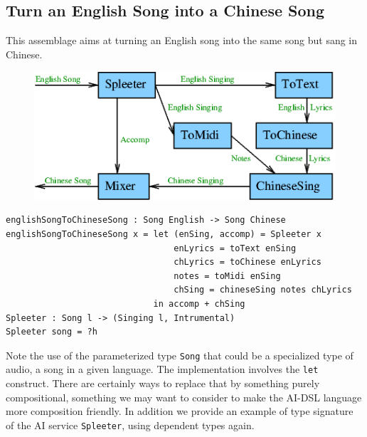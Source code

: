 \documentclass[]{article}
\begin{document}
\subsection{Turn an English Song into a Chinese Song}
This assemblage aims at turning an English song into the same song but
sang in Chinese.
\begin{figure}[H]
  \centering
  \includegraphics[scale=0.55]{figs/EnglishToChineseSong.png}
\end{figure}
\begin{verbatim}
englishSongToChineseSong : Song English -> Song Chinese
englishSongToChineseSong x = let (enSing, accomp) = Spleeter x
                                 enLyrics = toText enSing
                                 chLyrics = toChinese enLyrics
                                 notes = toMidi enSing
                                 chSing = chineseSing notes chLyrics
                             in accomp + chSing
Spleeter : Song l -> (Singing l, Intrumental)
Spleeter song = ?h
\end{verbatim}
Note the use of the parameterized type \texttt{Song} that could be a
specialized type of audio, a song in a given language.  The
implementation involves the \texttt{let} construct.  There are
certainly ways to replace that by something purely compositional,
something we may want to consider to make the AI-DSL language more
composition friendly.  In addition we provide an example of type
signature of the AI service \texttt{Spleeter}, using dependent types
again.
\end{document}
